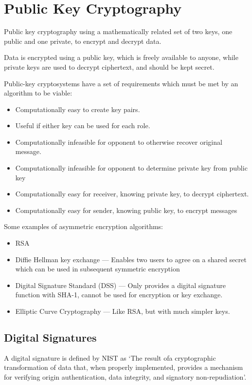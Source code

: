 \section{Public Key Cryptography}
Public key cryptography using a mathematically related set of two keys,
one public and one private, to encrypt and decrypt data.

Data is encrypted using a public key, which is freely available to anyone,
while private keys are used to decrypt ciphertext, and should be kept secret.

Public-key cryptosystems have a set of requirements which must be
met by an algorithm to be viable:
\begin{itemize}
    \item Computationally easy to create key pairs.
    \item Useful if either key can be used for each role.
    \item Computationally infeasible for opponent to otherwise recover original message.
    \item Computationally infeasible for opponent to determine private key from public key
    \item Computationally easy for receiver, knowing private key, to decrypt ciphertext.
    \item Computationally easy for sender, knowing public key, to encrypt messages
\end{itemize}

Some examples of asymmetric encryption algorithms:
\begin{itemize}
    \item RSA
    \item Diffie Hellman key exchange --- Enables two users to agree on a shared secret which can be used in subsequent symmetric encryption
    \item Digital Signature Standard (DSS) --- Only provides a digital signature function with SHA-1, cannot be used for encryption or key exchange.
    \item Elliptic Curve Cryptography --- Like RSA, but with much simpler keys.
\end{itemize}


\subsection{Digital Signatures}
A digital signature is defined by NIST as `The result ofa cryptographic transformation of data that,
when properly implemented, provides a mechanism for verifying origin authentication, data integrity, and
signatory non-repudiation'.


